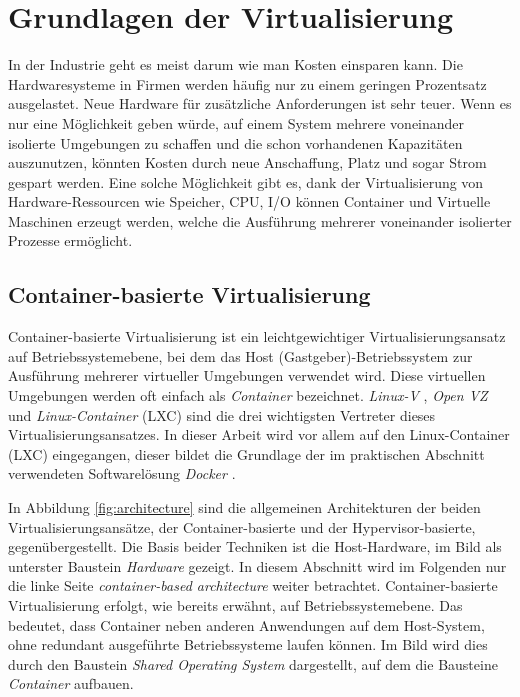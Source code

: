 \thispagestyle{empty}

\section{Grundlagen der Virtualisierung}

In der Industrie geht es meist darum wie man Kosten einsparen kann. Die Hardwaresysteme in Firmen werden häufig nur zu einem geringen Prozentsatz ausgelastet. Neue Hardware für zusätzliche Anforderungen ist sehr teuer. Wenn es nur eine Möglichkeit geben würde, auf einem System mehrere voneinander isolierte Umgebungen zu schaffen und die schon vorhandenen Kapazitäten auszunutzen, könnten Kosten durch neue Anschaffung, Platz und sogar Strom gespart werden. Eine solche Möglichkeit gibt es, dank der Virtualisierung von Hardware-Ressourcen wie Speicher, CPU, I/O können Container und Virtuelle Maschinen erzeugt werden, welche die Ausführung mehrerer voneinander isolierter Prozesse ermöglicht.

\pagebreak

\subsection{Container-basierte Virtualisierung}
Container-basierte Virtualisierung ist ein leichtgewichtiger Virtualisierungsansatz auf Betriebssystemebene, bei dem das Host (Gastgeber)-Betriebssystem zur Ausführung mehrerer virtueller Umgebungen verwendet wird. Diese virtuellen Umgebungen werden oft einfach als \emph{Container} bezeichnet. \emph{Linux-V} \cite{Overview2018PaperLinux-VServer}, \emph{Open VZ} \cite{IndexOpenvz.org} und \emph{Linux-Container} (LXC) \cite{IndexLinuxcontainers.Org} sind die drei wichtigsten Vertreter dieses Virtualisierungsansatzes. In dieser Arbeit wird vor allem auf den Linux-Container (LXC) eingegangen, dieser bildet die Grundlage der im praktischen Abschnitt verwendeten Softwarelösung \emph{Docker} \cite{MeineDockerPlatform}. 

In Abbildung \ref{fig:architecture} sind die allgemeinen Architekturen der beiden Virtualisierungsansätze, der Container-basierte und der Hypervisor-basierte, gegenübergestellt. Die Basis beider Techniken ist die Host-Hardware, im Bild als unterster Baustein \emph{Hardware} gezeigt. In diesem Abschnitt wird im Folgenden nur die linke Seite \emph{container-based architecture} weiter betrachtet. Container-basierte Virtualisierung erfolgt, wie bereits erwähnt, auf Betriebssystemebene. Das bedeutet, dass Container neben anderen Anwendungen auf dem Host-System, ohne redundant ausgeführte Betriebssysteme laufen können. Im Bild wird dies durch den Baustein \emph{Shared Operating System} dargestellt, auf dem die Bausteine \emph{Container} aufbauen. 

